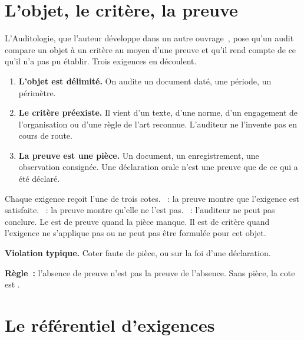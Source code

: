 \section{L'objet, le critère, la preuve}
\label{sec:c16-objet}

L'Auditologie, que l'auteur développe dans un autre ouvrage~\cite{minka2026auditologie}, pose qu'un audit
compare un objet à un critère au moyen d'une preuve et qu'il rend compte de ce qu'il n'a pas pu établir. Trois
exigences en découlent.

\begin{enumerate}
    \item \textbf{L'objet est délimité.} On audite un document daté, une période, un périmètre.
    \item \textbf{Le critère préexiste.} Il vient d'un texte, d'une norme, d'un engagement de l'organisation
          ou d'une règle de l'art reconnue. L'auditeur ne l'invente pas en cours de route.
    \item \textbf{La preuve est une pièce.} Un document, un enregistrement, une observation consignée. Une
          déclaration orale n'est une preuve que de ce qui a été déclaré.
\end{enumerate}

Chaque exigence reçoit l'une de trois cotes. \OUI{}~: la preuve montre que l'exigence est satisfaite.
\NON{}~: la preuve montre qu'elle ne l'est pas. \NEK{}~: l'auditeur ne peut pas conclure. Le \NEK{} est de
preuve quand la pièce manque. Il est de critère quand l'exigence ne s'applique pas ou ne peut pas être
formulée pour cet objet.

\begin{boxalert}
\textbf{Violation typique.} Coter \NON{} faute de pièce, ou \OUI{} sur la foi d'une déclaration.

\smallskip
\textbf{Règle~:} l'absence de preuve n'est pas la preuve de l'absence. Sans pièce, la cote est \NEK{}.
\end{boxalert}

\section{Le référentiel d'exigences}
\label{sec:c16-referentiel}

